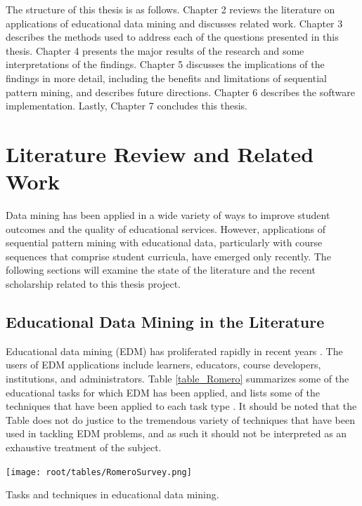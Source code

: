 The structure of this thesis is as follows.  Chapter 2 reviews the literature on applications of educational data mining and discusses related work.  Chapter 3 describes the methods used to address each of the questions presented in this thesis.  Chapter 4 presents the major results of the research and some interpretations of the findings.  Chapter 5 discusses the implications of the findings in more detail, including the benefits and limitations of sequential pattern mining, and describes future directions.  Chapter 6 describes the software implementation.  Lastly, Chapter 7 concludes this thesis.

\chapter{Literature Review and Related Work}

Data mining has been applied in a wide variety of ways to improve student outcomes and the quality of educational services.  However, applications of sequential pattern mining with educational data, particularly with course sequences that comprise student curricula, have emerged only recently.  The following sections will examine the state of the literature and the recent scholarship related to this thesis project.

\section{Educational Data Mining in the Literature}

Educational data mining (EDM) has proliferated rapidly in recent years \cite{Pena,Romero_2007}.  The users of EDM applications include learners, educators, course developers, institutions, and administrators.  Table \ref{table_Romero} summarizes some of the educational tasks for which EDM has been applied, and lists some of the techniques that have been applied to each task type \cite{Romero_2010}.  It should be noted that the Table does not do justice to the tremendous variety of techniques that have been used in tackling EDM problems, and as such it should not be interpreted as an exhaustive treatment of the subject.   

\begin{table}[htbp]
\begin{center}
\texttt{[image: root/tables/RomeroSurvey.png]}
\end{center}
\caption{Tasks and techniques in educational data mining.}
\label{table_Romero}
\end{table}

